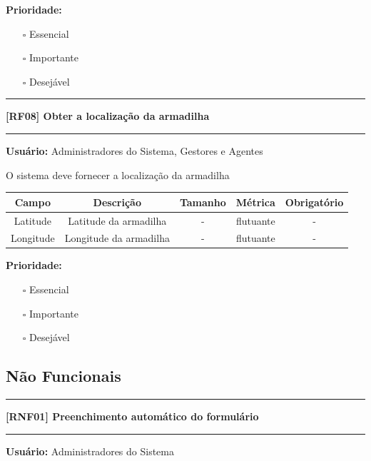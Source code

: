 	\textbf{Prioridade: }\begin{itemize}
		\item[\hspace{1cm}\rlap{\raisebox{0.2ex}{\hspace{0.4ex}\scriptsize \ding{56}}}$\square$]
		Essencial
		\item[\hspace{1cm}$\square$]
		Importante
		\item[\hspace{1cm}$\square$]
		Desejável
	\end{itemize}
	\begin{center}
		\noindent\rule{10cm}{0.4pt}
		\textbf{[RF08] Obter a localização da armadilha}
		\noindent\rule{10cm}{0.4pt}
	\end{center}
	\textbf{Usuário:} Administradores do Sistema, Gestores e Agentes
	
	O sistema deve fornecer a localização da armadilha
	
	\begin{center}
		\begin{adjustbox}{width=\textwidth}      \begin{tabular}{ |c|c|c|c|c| } 
			\hline
			\rowcolor{lightgray} Campo & Descrição & Tamanho & Métrica & Obrigatório \\
			\hline
			Latitude & Latitude da armadilha & - & flutuante & - \\ 
			\hline
			Longitude & Longitude da armadilha & - & flutuante & - \\ 
			\hline 
		\end{tabular}    \end{adjustbox}
	\end{center}
	
	\textbf{Prioridade: }\begin{itemize}
		\item[\hspace{1cm}\rlap{\raisebox{0.2ex}{\hspace{0.4ex}\scriptsize \ding{56}}}$\square$]
		Essencial
		\item[\hspace{1cm}$\square$]
		Importante
		\item[\hspace{1cm}$\square$]
		Desejável
	\end{itemize}
	
	\subsection*{Não Funcionais}
	\begin{center}
		\noindent\rule{10cm}{0.4pt}
		\textbf{[RNF01] Preenchimento automático do formulário}
		\noindent\rule{10cm}{0.4pt}
	\end{center}
	\textbf{Usuário:} Administradores do Sistema
	
